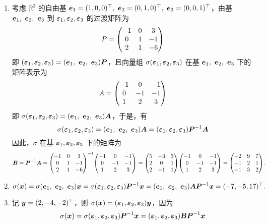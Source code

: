 \begin{solution}
    \begin{enumerate}[label=(\arabic{*})]
        \item 考虑 $\mathbb{R}^3$ 的自由基 $\vb*{e}_1=(1,0,0)^\top,~\vb*{e}_2=(0,1,0)^\top,~\vb*{e}_3=(0,0,1)^\top$，由基 $\vb*{e}_1,~\vb*{e}_2,~\vb*{e}_3$ 到 $\vb*{\varepsilon}_1,\vb*{\varepsilon}_2,\vb*{\varepsilon}_3$ 的过渡矩阵为
              $$P=\mqty(-1&0&3\\0&1&-1\\2&1&-6)$$
              即 $(\vb*{\varepsilon}_1,\vb*{\varepsilon}_2,\vb*{\varepsilon}_3)=(\vb*{e}_1,~\vb*{e}_2,~\vb*{e}_3)\vb*{P}$，且向量组 $\sigma(\vb*{\varepsilon}_1,\vb*{\varepsilon}_2,\vb*{\varepsilon}_3)$ 在基 $\vb*{e}_1,~\vb*{e}_2,~\vb*{e}_3$ 下的矩阵表示为
              $$A=\mqty(-1&0&-1\\0&-1&-1\\1&2&3)$$
              即 $\sigma(\vb*{\varepsilon}_1,\vb*{\varepsilon}_2,\vb*{\varepsilon}_3)=(\vb*{e}_1,~\vb*{e}_2,~\vb*{e}_3)\vb*{A}$，于是，有
              $$\sigma(\vb*{\varepsilon}_1,\vb*{\varepsilon}_2,\vb*{\varepsilon}_3)=(\vb*{e}_1,~\vb*{e}_2,~\vb*{e}_3)\vb*{A}=(\vb*{\varepsilon}_1,\vb*{\varepsilon}_2,\vb*{\varepsilon}_3)\vb*{P}^{-1}\vb*{A}$$
              因此，$\sigma$ 在基 $\vb*{\varepsilon}_1,\vb*{\varepsilon}_2,\vb*{\varepsilon}_3$ 下的矩阵为
              $$\vb*{B}=\vb*{P}^{-1}\vb*{A}=\mqty(-1&0&3\\0&1&-1\\2&1&-6)^{-1}\mqty(-1&0&-1\\0&-1&-1\\1&2&3)=\mqty(5&-3&3\\2&0&1\\2&-1&1)\mqty(-1&0&-1\\0&-1&-1\\1&2&3)=\mqty(-2&9&7\\-1&2&1\\-1&3&2).$$
        \item $\sigma(\vb*{x})=\sigma(\vb*{e}_1,~\vb*{e}_2,~\vb*{e}_3)\vb*{x}=\sigma(\vb*{\varepsilon}_1,\vb*{\varepsilon}_2,\vb*{\varepsilon}_3)\vb*{P}^{-1}\vb*{x}=(\vb*{e}_1,~\vb*{e}_2,~\vb*{e}_3)\vb*{AP}^{-1}\vb*{x}=(-7,-5,17)^\top.$
        \item 记 $\vb*{y}=(2,-4,-2)^\top$，则 $\sigma(\vb*{x})=(\vb*{\varepsilon}_1,\vb*{\varepsilon}_2,\vb*{\varepsilon}_3)\vb*{y}$，因为
              $$\sigma(\vb*{x})=\sigma(\vb*{\varepsilon}_1,\vb*{\varepsilon}_2,\vb*{\varepsilon}_3)\vb*{P}^{-1}\vb*{x}=(\vb*{\varepsilon}_1,\vb*{\varepsilon}_2,\vb*{\varepsilon}_3)\vb*{BP}^{-1}\vb*{x}$$

\end{enumerate}
\end{solution}
